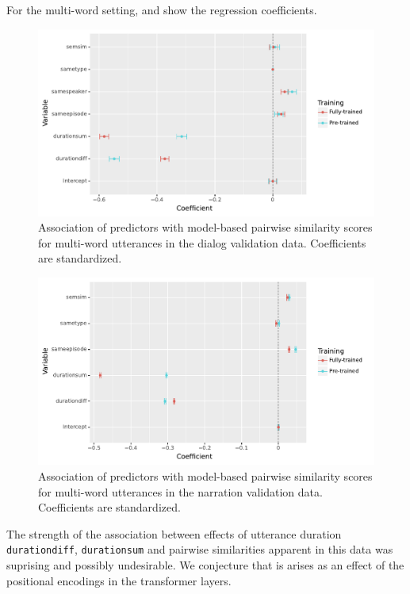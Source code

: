 For the multi-word setting,  and
 show the regression coefficients.
\begin{figure}
  \centering
  \includegraphics[scale=0.66]{results/grsa_dialog_multiword_coef.pdf}
  \caption{Association of predictors with 
    model-based pairwise similarity scores for multi-word utterances
    in the dialog validation data. Coefficients are standardized.}
  \label{fig:coef_multiword_dialog}
\end{figure}

\begin{figure}
  \centering
  \includegraphics[scale=0.66]{results/grsa_narration_multiword_coef.pdf}
  \caption{Association of predictors with 
    model-based pairwise similarity scores for multi-word utterances
    in the narration validation data. Coefficients are standardized.}
  \label{fig:coef_multiword_narration}
\end{figure}




The strength of the association between effects of utterance
duration {\tt durationdiff}, {\tt durationsum} and pairwise similarities apparent in this
data was suprising and possibly undesirable. We conjecture that is
arises as an effect of the positional encodings in the transformer
layers.

